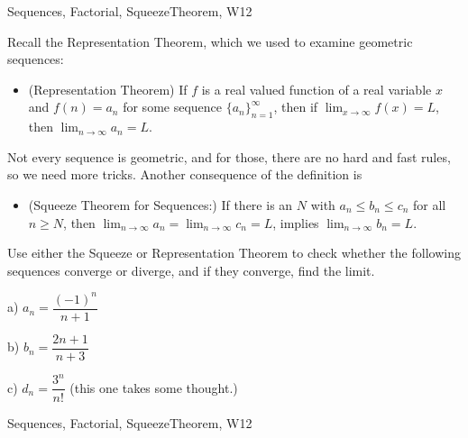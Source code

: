 \begin{tagblock}{Sequences, Factorial, SqueezeTheorem, W12}
\begin{question}

Recall the Representation Theorem, which we used to examine geometric sequences:

\bigskip

\begin{itemize} 



\item (Representation Theorem) If $f$ is a real valued function of a real variable $x$ and $f(n)=a_n$ for some sequence $\{a_n\}_{n=1}^{\infty}$, then if $\displaystyle\lim_{x\to\infty}f(x)=L$, then $\displaystyle\lim_{n\to\infty}a_n=L$.

\end{itemize} 



Not every sequence is geometric, and for those, there are no hard and fast rules, so we need more tricks. Another consequence of the definition is 

\begin{itemize} 

\item (Squeeze Theorem for Sequences:) If there is an $N$ with $a_n\leq b_n\leq c_n$ for all $n\geq N$, then $\displaystyle\lim_{n\to\infty}a_n=\displaystyle\lim_{n\to\infty}c_n=L$, implies $\displaystyle\lim_{n\to\infty}b_n=L$. 

\end{itemize}

Use either the Squeeze or Representation Theorem to check whether the following sequences converge or diverge, and if they converge, find the limit.

\bigskip

a) $a_n=\dfrac {(-1)^n}{n+1}$

\bigskip

b) $b_n=\dfrac{2n+1}{n+3}$

\bigskip

c) $d_n=\dfrac{3^n}{n!}$ (this one takes some thought.)

	
	
\begin{tags}
	    Sequences, Factorial, SqueezeTheorem, W12
\end{tags}
	
\begin{diary}
	   
\end{diary}
	
\begin{solution}	

\end{solution}
	
\end{question}

\end{tagblock}

